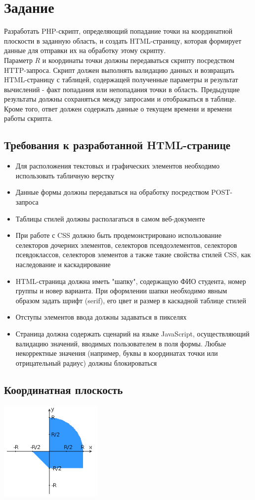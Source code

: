 \documentclass[12pt,a4paper]{report}
\begin{document}
\section*{Задание}
Разработать PHP-скрипт, определяющий попадание точки на координатной плоскости в заданную область, и создать HTML-страницу, которая формирует данные для отправки их на обработку этому скрипту. \\
\hfill\break
Параметр $R$ и координаты точки должны передаваться скрипту посредством HTTP-запроса. Скрипт должен выполнять валидацию данных и возвращать HTML-страницу с таблицей, содержащей полученные параметры и результат вычислений - факт попадания или непопадания точки в область. Предыдущие результаты должны сохраняться между запросами и отображаться в таблице. \\
\hfill\break
Кроме того, ответ должен содержать данные о текущем времени и времени работы скрипта.
\subsection*{Требования к разработанной HTML-странице}
\begin{itemize}
    \item Для расположения текстовых и графических элементов необходимо использовать табличную верстку
    \item Данные формы должны передаваться на обработку посредством POST-запроса
    \item Таблицы стилей должны располагаться в самом веб-документе
    \item При работе с CSS должно быть продемонстрировано использование селекторов дочерних элементов, селекторов псевдоэлементов, селекторов псевдоклассов, селекторов элементов а также такие свойства стилей CSS, как наследование и каскадирование
    \item HTML-страница должна иметь "шапку", содержащую ФИО студента, номер группы и новер варианта. При оформлении шапки необходимо явным образом задать шрифт (serif), его цвет и размер в каскадной таблице стилей
    \item Отступы элементов ввода должны задаваться в пикселях
    \item Страница должна содержать сценарий на языке JavaScript, осуществляющий валидацию значений, вводимых пользователем в поля формы. Любые некорректные значения (например, буквы в координатах точки или отрицательный радиус) должны блокироваться
\end{itemize}
\subsection*{Координатная плоскость}
\begin{center}
    \includegraphics*[width=5cm]{graph.png}
\end{center}
\end{document}
